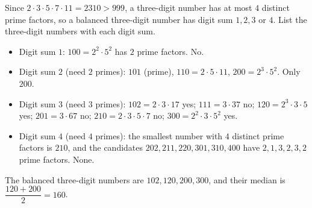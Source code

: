 Since $2\cdot3\cdot5\cdot7\cdot11=2310>999$, a three-digit number has at most $4$ distinct prime factors, so a balanced three-digit number has digit sum $1,2,3$ or $4$. List the three-digit numbers with each digit sum.
\begin{itemize}
\item Digit sum $1$: $100=2^2\cdot5^2$ has $2$ prime factors. No.
\item Digit sum $2$ (need $2$ primes): $101$ (prime), $110=2\cdot5\cdot11$, $200=2^3\cdot5^2$. Only $200$.
\item Digit sum $3$ (need $3$ primes): $102=2\cdot3\cdot17$ yes; $111=3\cdot37$ no; $120=2^3\cdot3\cdot5$ yes; $201=3\cdot67$ no; $210=2\cdot3\cdot5\cdot7$ no; $300=2^2\cdot3\cdot5^2$ yes.
\item Digit sum $4$ (need $4$ primes): the smallest number with $4$ distinct prime factors is $210$, and the candidates $202,211,220,301,310,400$ have $2,1,3,2,3,2$ prime factors. None.
\end{itemize}
The balanced three-digit numbers are $102,120,200,300$, and their median is $\dfrac{120+200}{2}=\boxed{160}$.
